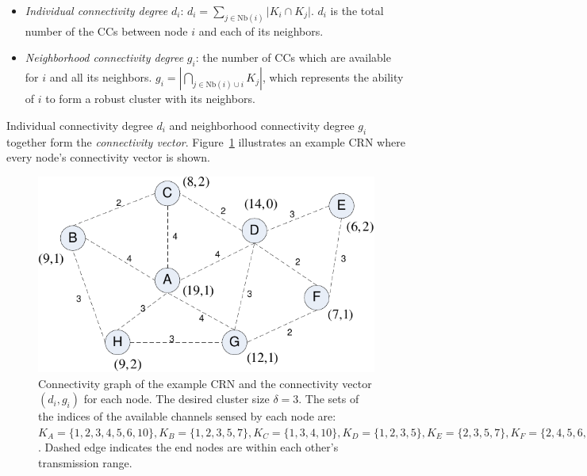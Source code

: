 \documentclass[times]{ettauth}
\theoremstyle{mytheoremstyle}
\theoremstyle{mytheoremstyle}
\theoremstyle{mytheoremstyle}
\begin{document}




\begin{itemize}

\item \textit{Individual connectivity degree} $d_i$: $d_i=\sum_{j\in \text{Nb}(i)}\vert K_i\cap K_j\vert$. 
$d_i$ is the total number of the CCs between node $i$ and each of its neighbors.

\item \textit{Neighborhood connectivity degree} $g_i$: the number of CCs which are available for $i$ and all its neighbors.
$g_i=|\bigcap_{j\in \text{Nb}(i)\cup i}K_j|$, which represents the ability of $i$ to form a robust cluster with its neighbors.
\end{itemize}
Individual connectivity degree $d_i$ and neighborhood connectivity degree $g_i$ together form the \textit{connectivity vector}.
Figure~\ref{fig1} illustrates an example CRN where every node's connectivity vector is shown.	
\begin{figure}[ht!]
  \centering
\includegraphics[width=0.7\linewidth]{figure1.pdf}
	\caption{Connectivity graph of the example CRN and the connectivity vector $(d_i, g_i)$ for each node. The desired cluster size $\delta =3$. The sets of the indices of the available channels sensed by each node are: $K_A=\{1,2,3,4,5,6,10\}, K_B=\{1,2,3,5,7\}, K_C=\{1,3,4,10\}, K_D=\{1,2,3,5\}, K_E=\{2,3,5,7\}, K_F=\{2,4,5,6,7\}, K_G=\{1,2,3,4,8\}, K_H=\{1,2,5,8\}$. Dashed edge indicates the end nodes are within each other's transmission range.}
	\label{fig1}
\end{figure}

	
\end{document}
